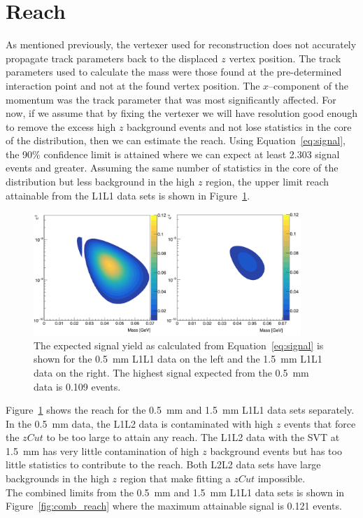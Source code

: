 \section{Reach}
As mentioned previously, the vertexer used for reconstruction does not accurately propagate track parameters back to the displaced $z$ vertex position. The track parameters used to calculate the mass were those found at the pre-determined interaction point and not at the found vertex position. The $x$--component of the momentum was the track parameter that was most significantly affected. For now, if we assume that by fixing the vertexer we will have resolution good enough to remove the excess high $z$ background events and not lose statistics in the core of the distribution, then we can estimate the reach. Using Equation~\eqref{eq:signal}, the 90$\%$ confidence limit is attained where we can expect at least 2.303 signal events and greater. Assuming the same number of statistics in the core of the distribution but less background in the high $z$ region, the upper limit reach attainable from the L1L1 data sets is shown in Figure~\ref{fig:L1L1_reach}.

\begin{figure}[htb]
  \centering
      \includegraphics[width=0.9\textwidth]{pics/results/reach_sets.png}
  \caption[Expected signal yield for the individual L1L1 data sets]{The expected signal yield as calculated from Equation~\eqref{eq:signal} is shown for the 0.5~mm L1L1 data on the left and the 1.5~mm L1L1 data on the right. The highest signal expected from the 0.5~mm data is 0.109 events.}
  \label{fig:L1L1_reach}
\end{figure} 

Figure~\ref{fig:L1L1_reach} shows the reach for the 0.5~mm and 1.5~mm L1L1 data sets separately. In the 0.5~mm data, the L1L2 data is contaminated with high $z$ events that force the $zCut$ to be too large to attain any reach. The L1L2 data with the SVT at 1.5~mm has very little contamination of high $z$ background events but has too little statistics to contribute to the reach. Both L2L2 data sets have large backgrounds in the high $z$ region that make fitting a $zCut$ impossible. \\
\indent The combined limits from the 0.5~mm and 1.5~mm L1L1 data sets is shown in Figure~\ref{fig:comb_reach} where the maximum attainable signal is 0.121 events. 

